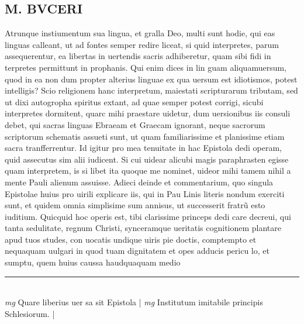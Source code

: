 \documentclass{article}
\begin{document}
\begin{pages}
\section*{M. BVCERI }\pstart Atrunque instiumentum sua lingua, et gralla Deo, multi sunt hodie, qui eas linguas calleant, ut ad fontes semper redire liceat, si quid interpretes, parum assequerentur, ea libertas in uertendis sacris adhiberetur, quam sibi fidi in terpretes permittunt in prophanis. Qui enim dices in lin guam aliquamuersum, quod in ea non dum propter alterius linguae ex qua uersum est idiotismos, potest intelligis? Scio religionem hanc interpretum, maiestati scripturarum tributam, sed ut dixi autogropha spiritus extant, ad quae semper potest corrigi, sicubi interpretes dormitent, quarc mihi praestare uidetur, dum uersionibus iis consuli debet, qui sacras linguas Ebraeam et Graecam ignorant, neque sacrorum scriptorum schematis assueti sunt, ut quam familiarissime et planissime etiam sacra tranfferrentur. Id igitur pro mea tenuitate in hac Epistola dedi operam, quid assecutus sim alii iudicent. Si cui uidear alicubi magis paraphrasten egisse quam interpretem, is si libet ita quoque me nominet, uideor mihi tamem nihil a mente Pauli alienum assuisse. Adieci deinde et commentarium, quo singula Epistolae huius pro uirili explicare iis, qui in Pau Linis literis nondum exerciti sunt, et quidem omnia simplisime sum annisus, ut successerit fratrũ esto iuditium.   \pend\pstart Quicquid hoc operis est, tibi clarissime princeps dedi care decreui, qui tanta sedulitate, regnum Christi, synceramque ueritatis cognitionem plantare apud tuos studes, con uocatis undique uiris pie doctis, comptempto et nequaquam uulgari in quod tuam dignitatem et opes adducis pericu lo, et sumptu, quem huius caussa haudquaquam medio\pend
\vspace{0.5cm}\noindent
\vspace{0.2cm}\rule{1cm}{0.2pt}\\ 
\hspace{0.2cm}\textit{mg}
\footnotesize Quare liberius uer sa sit Epistola
\normalsize| 
\hspace{0.2cm}\textit{mg}
\footnotesize Institutum imitabile principis Schlesiorum.  
\normalsize| 

\end{pages}
\end{document}
